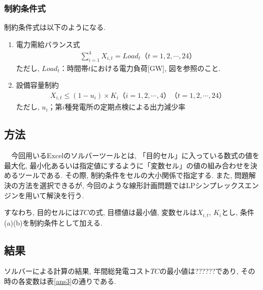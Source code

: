 \documentclass[]{jsarticle}
\begin{document}
      \subsubsection{制約条件式}
          制約条件式は以下のようになる.
          \begin{enumerate}
          \renewcommand{\labelenumi}{(\alph{enumi})}
            \item 電力需給バランス式
              \begin{eqnarray}
                \label{text19}
                \sum_{i=1}^4 X_{i,t} = Load_t　（t = 1, 2, \cdots , 24）
              \end{eqnarray}
              ただし, $Load_t$：時間帯$t$における電力負荷[GW], 図を参照のこと.\\
            \item 設備容量制約
              \begin{eqnarray}
                \label{text20}
                X_{i,t} \le (1 - u_i)\times K_i　（i = 1, 2, \cdots , 4）（t = 1, 2, \cdots , 24）
              \end{eqnarray}
              ただし, $u_i$；第$i$種発電所の定期点検による出力減少率
          \end{enumerate}


  \subsection{方法}
      　今回用いるExcelのソルバーツールとは, 「目的セル」に入っている数式の値を最大化, 最小化あるいは指定値にするように「変数セル」の値の組み合わせを決めるツールである. その際, 制約条件をセルの大小関係で指定する. また, 問題解決の方法を選択できるが, 今回のような線形計画問題ではLPシンプレックスエンジンを用いて解決を行う.

      すなわち, 目的セルには$TC$の式, 目標値は最小値, 変数セルは$X_{i,t}$, $K_i$とし, 条件(a)(b)を制約条件として加える.

  \subsection{結果}
      ソルバーによる計算の結果, 年間総発電コスト$TC$の最小値は??????であり, その時の各変数は表\ref{ans3}の通りである.
\end{document}
